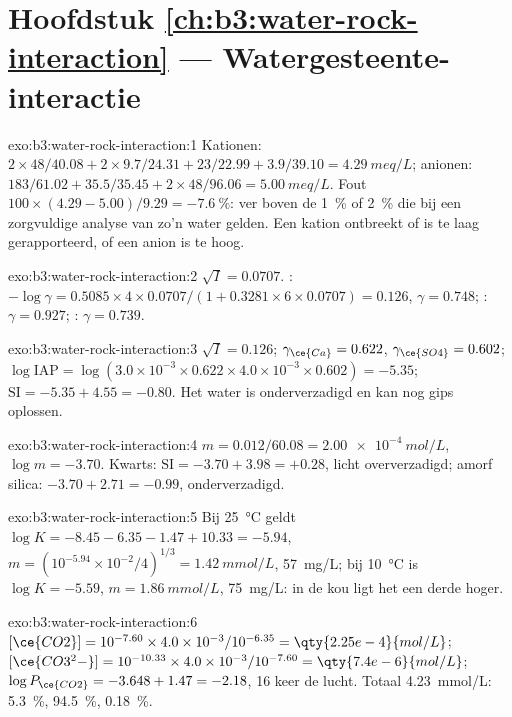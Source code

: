 \section*{Hoofdstuk \ref{ch:b3:water-rock-interaction} --- Watergesteente-interactie}

\begin{solution}{exo:b3:water-rock-interaction:1}
Kationen: $2\times48/40.08 + 2\times9.7/24.31 + 23/22.99 + 3.9/39.10 =
\qty{4.29}{meq/L}$; anionen: $183/61.02 + 35.5/35.45 + 2\times48/96.06 =
\qty{5.00}{meq/L}$. Fout $100\times(4.29 - 5.00)/9.29 = \qty{-7.6}{\percent}$:
ver boven de \qty{1}{\percent} of \qty{2}{\percent} die bij een zorgvuldige analyse van zo'n water gelden.
Een kation ontbreekt of is te laag gerapporteerd, of een anion is te hoog.
\end{solution}

\begin{solution}{exo:b3:water-rock-interaction:2}
$\sqrt I = 0.0707$. : $-\log\gamma = 0.5085\times4\times0.0707/(1 +
0.3281\times6\times0.0707) = 0.126$, $\gamma = 0.748$; : $\gamma =
0.927$; : $\gamma = 0.739$.
\end{solution}

\begin{solution}{exo:b3:water-rock-interaction:3}
$\sqrt I = 0.126$; $\gamma_{\ce{Ca}} = 0.622$, $\gamma_{\ce{SO4}} = 0.602$;
$\log\mathrm{IAP} = \log(3.0\times10^{-3}\times0.622\times4.0\times10^{-3}
\times0.602) = -5.35$; $\mathrm{SI} = -5.35 + 4.55 = -0.80$. Het water is
onderverzadigd en kan nog gips oplossen.
\end{solution}

\begin{solution}{exo:b3:water-rock-interaction:4}
$m = 0.012/60.08 = \qty{2.00e-4}{mol/L}$, $\log m = -3.70$. Kwarts:
$\mathrm{SI} = -3.70 + 3.98 = +0.28$, licht oververzadigd; amorf
silica: $-3.70 + 2.71 = -0.99$, onderverzadigd.
\end{solution}

\begin{solution}{exo:b3:water-rock-interaction:5}
Bij \qty{25}{\celsius} geldt $\log K = -8.45 - 6.35 - 1.47 + 10.33 = -5.94$, $m =
(10^{-5.94}\times10^{-2}/4)^{1/3} = \qty{1.42}{mmol/L}$, \qty{57}{mg/L}; bij
\qty{10}{\celsius} is $\log K = -5.59$, $m = \qty{1.86}{mmol/L}$,
\qty{75}{mg/L}: in de kou ligt het een derde hoger.
\end{solution}

\begin{solution}{exo:b3:water-rock-interaction:6}
$[\ce{CO2}] = 10^{-7.60}\times4.0\times10^{-3}/10^{-6.35} =
\qty{2.25e-4}{mol/L}$; $[\ce{CO3^2-}] = 10^{-10.33}\times4.0\times10^{-3}/
10^{-7.60} = \qty{7.4e-6}{mol/L}$; $\log P_{\ce{CO2}} = -3.648 + 1.47 =
-2.18$, 16 keer de lucht. Totaal \qty{4.23}{mmol/L}: 
\qty{5.3}{\percent},  \qty{94.5}{\percent}, 
\qty{0.18}{\percent}.
\end{solution}

